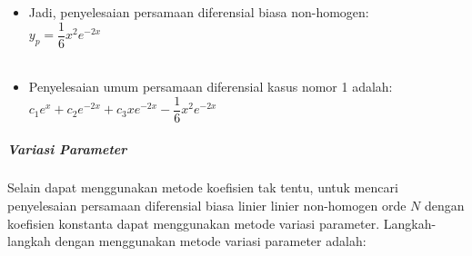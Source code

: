 \begin{enumerate}[1.]
\begin{itemize}
	\item Jadi, penyelesaian persamaan diferensial biasa non-homogen: \\
	\begin{math} y_p = \dfrac{1}{6} x^{2} e^{-2x} \end{math} \\ \\
	\item Penyelesaian umum persamaan diferensial kasus nomor 1 adalah: \\
	\begin{math} c_1 e^{x} + c_2 e^{-2x} + c_3 xe^{-2x} - \dfrac{1}{6} x^{2} e^{-2x} \end{math}

	\end{itemize}

\end{enumerate}

\subparagraph{Variasi Parameter}
\label{parff:parameter2}

Selain dapat menggunakan metode koefisien tak tentu, untuk mencari penyelesaian persamaan diferensial biasa linier linier non-homogen orde \begin{math} N \end{math} dengan koefisien konstanta dapat menggunakan metode variasi parameter. Langkah-langkah dengan menggunakan metode variasi parameter adalah:


